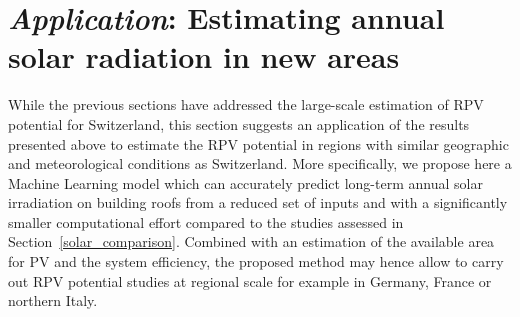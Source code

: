 \section{\textit{Application}: Estimating annual solar radiation in new areas}
\label{solar_application}

\label{chile_method}

While the previous sections have addressed the large-scale estimation of RPV potential for Switzerland, this section suggests an application of the results presented above to estimate the RPV potential in regions with similar geographic and meteorological conditions as Switzerland.
More specifically, we propose here a Machine Learning model which can accurately predict long-term annual solar irradiation on building roofs from a reduced set of inputs and with a significantly smaller computational effort compared to the studies assessed in Section~\ref{solar_comparison}. 
Combined with an estimation of the available area for PV and the system efficiency, the proposed method may hence allow to carry out RPV potential studies at regional scale for example in Germany, France or northern Italy.


